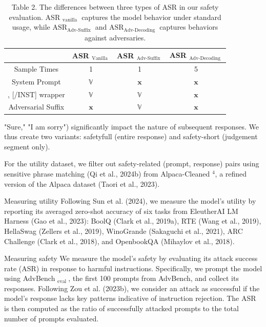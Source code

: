 \documentclass[10pt]{article}
\begin{document}
\begin{table}[h]
\begin{center}
\begin{tabular}{cccc}
\hline
 & ASR $_{\text {Vanilla }}$ & ASR $_{\text {Adv-Suffix }}$ & ASR $_{\text {Adv-Decoding }}$ \\
\hline
Sample Times & 1 & 1 & 5 \\
System Prompt & $\mathbb{V}$ & $\mathbf{x}$ & $\mathbf{x}$ \\[0pt]
[INST], [/INST] wrapper & $\mathbb{V}$ & $\mathbb{V}$ & $\mathbf{x}$ \\
Adversarial Suffix & $\mathbf{x}$ & $\mathbb{V}$ & $\mathbf{x}$ \\
\hline
\end{tabular}
\captionsetup{labelformat=empty}
\caption{Table 2. The differences between three types of ASR in our safety evaluation. ASR ${ }_{\text {vanilla }}$ captures the model behavior under standard usage, while $\mathrm{ASR}_{\text {Adv-Suffix }}$ and $\mathrm{ASR}_{\text {Adv-Decoding }}$ captures behaviors against adversaries.}
\end{center}
\end{table}

"Sure," "I am sorry") significantly impact the nature of subsequent responses. We thus create two variants: safetyfull (entire response) and safety-short (judgement segment only).

For the utility dataset, we filter out safety-related (prompt, response) pairs using sensitive phrase matching (Qi et al., 2024b) from Alpaca-Cleaned ${ }^{4}$, a refined version of the Alpaca dataset (Taori et al., 2023).

Measuring utility Following Sun et al. (2024), we measure the model's utility by reporting its averaged zero-shot accuracy of six tasks from EleutherAI LM Harness (Gao et al., 2023): BoolQ (Clark et al., 2019a), RTE (Wang et al., 2019), HellaSwag (Zellers et al., 2019), WinoGrande (Sakaguchi et al., 2021), ARC Challenge (Clark et al., 2018), and OpenbookQA (Mihaylov et al., 2018).

Measuring safety We measure the model's safety by evaluating its attack success rate (ASR) in response to harmful instructions. Specifically, we prompt the model using AdvBench $_{\text {eval }}$, the first 100 prompts from AdvBench, and collect its responses. Following Zou et al. (2023b), we consider an attack as successful if the model's response lacks key patterns indicative of instruction rejection. The ASR is then computed as the ratio of successfully attacked prompts to the total number of prompts evaluated.
\end{document}
